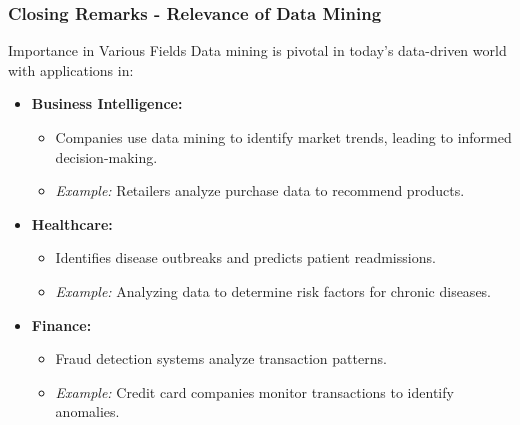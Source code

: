 \documentclass[aspectratio=169]{beamer}
\begin{document}
\begin{frame}[fragile]
    \frametitle{Closing Remarks - Relevance of Data Mining}
    \begin{block}{Importance in Various Fields}
        Data mining is pivotal in today’s data-driven world with applications in:
        \begin{itemize}
            \item \textbf{Business Intelligence:}
                \begin{itemize}
                    \item Companies use data mining to identify market trends, leading to informed decision-making.
                    \item \textit{Example:} Retailers analyze purchase data to recommend products.
                \end{itemize}
            \item \textbf{Healthcare:}
                \begin{itemize}
                    \item Identifies disease outbreaks and predicts patient readmissions.
                    \item \textit{Example:} Analyzing data to determine risk factors for chronic diseases.
                \end{itemize}
            \item \textbf{Finance:}
                \begin{itemize}
                    \item Fraud detection systems analyze transaction patterns.
                    \item \textit{Example:} Credit card companies monitor transactions to identify anomalies.
                \end{itemize}
        \end{itemize}
    \end{block}
\end{frame}
\end{document}
